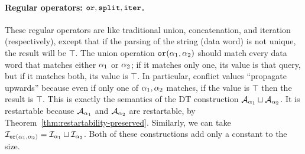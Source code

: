 


\paragraph*{Regular operators: $\texttt{or}, \texttt{split}, \texttt{iter}$.}
These regular operators are like traditional union, concatenation, and iteration (respectively), except that if the parsing of the string (data word) is not unique, the result will be $\top$.
The union operation $\texttt{or}(\alpha_1, \alpha_2)$ should match every data word that matches either $\alpha_1$ or $\alpha_2$; if it matches only one, its value is that query, but if it matches both, its value is $\top$. In particular, conflict values ``propagate upwards'' because even if only one of $\alpha_1, \alpha_2$ matches, if the value is $\top$ then the result is $\top$. This is exactly the semantics of the DT construction $\mathcal{A}_{\alpha_1} \sqcup \mathcal{A}_{\alpha_2}$. It is restartable because $\mathcal{A}_{\alpha_1}$ and $\mathcal{A}_{\alpha_2}$ are restartable, by Theorem~\ref{thm:restartability-preserved}.
Similarly, we can take $\mathcal{I}_{\texttt{or}(\alpha_1,\alpha_2)} = \mathcal{I}_{\alpha_1} \sqcup \mathcal{I}_{\alpha_2}$.
Both of these constructions add only a constant to the size.

